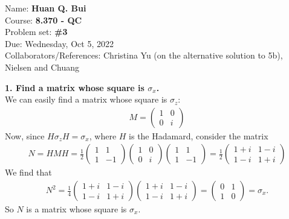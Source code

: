 \documentclass{article}
\theoremstyle{definition}
\newcommand{\f}[2]{\frac{#1}{#2}}
\begin{document}
\begin{framed}
\noindent Name: \textbf{Huan Q. Bui}\\
Course: \textbf{8.370 - QC}\\
Problem set: \textbf{\#3}\\
Due: Wednesday, Oct 5, 2022\\
Collaborators/References: Christina Yu (on the alternative solution to 5b), Nielsen and Chuang
\end{framed}

\noindent \textbf{1. Find a matrix whose square is $\sigma_x$.}\\

\noindent We can easily find a matrix whose square is $\sigma_z$:
\begin{align*}
	M = \begin{pmatrix}
		1 & 0 \\ 0 & i
	\end{pmatrix}
\end{align*}
Now, since $H \sigma_z H = \sigma_x$, where $H$ is the Hadamard, consider the matrix
\begin{align*}
	N = HMH = \f{1}{2}\begin{pmatrix}
		1 & 1 \\ 1 & -1
	\end{pmatrix}
	\begin{pmatrix}
		1 & 0 \\ 0 & i
	\end{pmatrix}
	\begin{pmatrix}
		1 & 1 \\ 1 & -1
	\end{pmatrix}
	= \f{1}{2}
	\begin{pmatrix}
		1 + i & 1 - i \\ 1 -i & 1 + i
	\end{pmatrix}
\end{align*}
We find that
\begin{align*}
	N^2 = \f{1}{4}
	\begin{pmatrix}
		1 + i & 1 - i \\ 1 -i & 1 + i
	\end{pmatrix} 
\begin{pmatrix}
1 + i & 1 - i \\ 1 -i & 1 + i
\end{pmatrix} = \begin{pmatrix}
0 & 1 \\ 1 & 0 
\end{pmatrix} = \sigma_x.
\end{align*}
So $N$ is a matrix whose square is $\sigma_x$.\\
\end{document}
